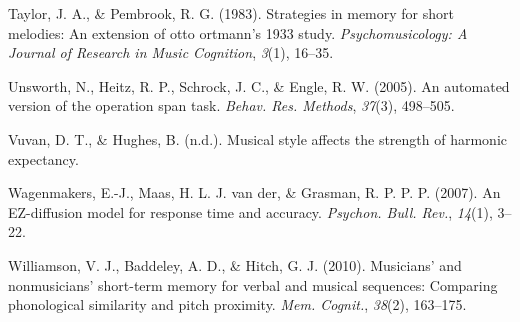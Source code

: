 \documentclass[english,man]{apa6}
\begin{document}
\leavevmode\hypertarget{ref-Taylor1983-uc}{}%
Taylor, J. A., \& Pembrook, R. G. (1983). Strategies in memory for short melodies: An extension of otto ortmann's 1933 study. \emph{Psychomusicology: A Journal of Research in Music Cognition}, \emph{3}(1), 16--35.

\leavevmode\hypertarget{ref-Unsworth2005-tz}{}%
Unsworth, N., Heitz, R. P., Schrock, J. C., \& Engle, R. W. (2005). An automated version of the operation span task. \emph{Behav. Res. Methods}, \emph{37}(3), 498--505.

\leavevmode\hypertarget{ref-Vuvan_undated-zi}{}%
Vuvan, D. T., \& Hughes, B. (n.d.). Musical style affects the strength of harmonic expectancy.

\leavevmode\hypertarget{ref-Wagenmakers2007-qf}{}%
Wagenmakers, E.-J., Maas, H. L. J. van der, \& Grasman, R. P. P. P. (2007). An EZ-diffusion model for response time and accuracy. \emph{Psychon. Bull. Rev.}, \emph{14}(1), 3--22.

\leavevmode\hypertarget{ref-Williamson2010-dw}{}%
Williamson, V. J., Baddeley, A. D., \& Hitch, G. J. (2010). Musicians' and nonmusicians' short-term memory for verbal and musical sequences: Comparing phonological similarity and pitch proximity. \emph{Mem. Cognit.}, \emph{38}(2), 163--175.

\endgroup
\end{document}

